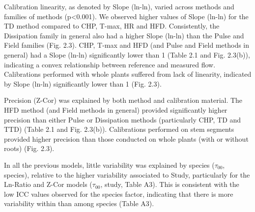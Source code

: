 \documentclass[11pt,twoside]{reedthesis}
\begin{document}
Calibration linearity, as denoted by Slope (ln-ln), varied across
methods and families of methods (p\textless{}0.001). We observed higher
values of Slope (ln-ln) for the TD method compared to CHP, T-max, HR and
HFD. Consistently, the Dissipation family in general also had a higher
Slope (ln-ln) than the Pulse and Field families (Fig. 2.3). CHP, T-max
and HFD (and Pulse and Field methods in general) had a Slope (ln-ln)
significantly lower than 1 (Table 2.1 and Fig. 2.3(b)), indicating a
convex relationship between reference and measured flow. Calibrations
performed with whole plants suffered from lack of linearity, indicated
by Slope (ln-ln) significantly lower than 1 (Fig. 2.3).\par

Precision (Z-Cor) was explained by both method and calibration material.
The HFD method (and Field methods in general) provided significantly
higher precision than either Pulse or Dissipation methods (particularly
CHP, TD and TTD) (Table 2.1 and Fig. 2.3(b)). Calibrations performed on
stem segments provided higher precision than those conducted on whole
plants (with or without roots) (Fig. 2.3).\par

In all the previous models, little variability was explained by species
(\(\tau_{00}\), species), relative to the higher variability associated
to Study, particularly for the Ln-Ratio and Z-Cor models (\(\tau_{00}\),
study, Table A3). This is consistent with the low ICC values observed
for the species factor, indicating that there is more variability within
than among species (Table A3).\par
\end{document}
